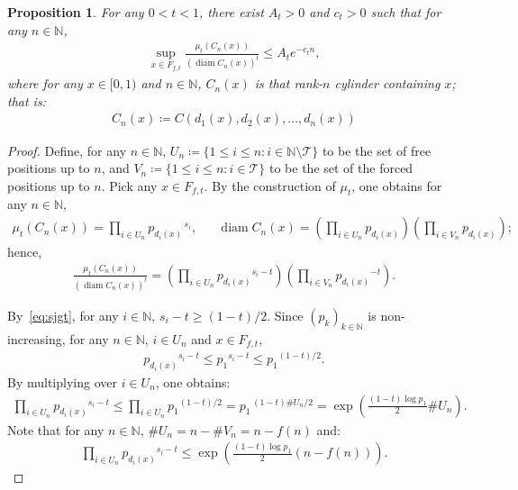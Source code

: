 \documentclass[12pt,reqno]{amsart}
\theoremstyle{definition}
\theoremstyle{plain}
\newtheorem{prop}{Proposition}
\begin{document}
\begin{prop}\label{prop: length-cylinder}
    For any $0<t<1$, there exist $A_t>0$ and $c_t>0$ such that for any $n\in\mathbb{N}$,
    \begin{align*}
        \sup_{x\in F_{f,t}}\frac{\mu_t(C_n(x))}{\left({\operatorname{diam}{C_n(x)}}\right)^t}
        \leq {A_t}{e^{-c_tn}},
    \end{align*}
    where for any $x\in[0,1)$ and $n\in\mathbb{N}$, $C_n(x)$ is that rank-$n$ cylinder containing $x$; that is:
    \begin{align*}
        C_n(x)\coloneqq C\left(d_1(x),d_2(x),\ldots,d_n(x)\right)
    \end{align*}
\end{prop}
\begin{proof}
    Define, for any $n\in\mathbb{N}$, $U_n\coloneqq \{1\leq i\leq n: i\in\mathbb{N}\setminus \mathcal{T} \}$ to be the set of free positions up to $n$, and $V_n\coloneqq \{1\leq i\leq n: i\in \mathcal{T} \}$ to be the set of the forced positions up to $n$. Pick any $x\in F_{f,t}$. 
    By the construction of $\mu_t$, one obtains for any $n\in\mathbb{N}$,
    \begin{align*}
        \mu_t(C_n(x))=\prod_{i\in U_n} {p_{d_i(x)}}^{\,s_{i}}, &&
        \operatorname{diam}{C_n(x)}
        =\left(\prod_{i\in U_n} p_{d_i(x)}\right) \left(\prod_{i\in V_n} p_{d_i(x)}\right);
    \end{align*}
    hence,
    \begin{align}\label{eq:ratio}
        \frac{\mu_t(C_n(x))}{\left(\operatorname{diam}{C_n(x)}\right)^t}
        =\left(\prod_{i\in U_n} {p_{d_i(x)}}^{s_i-t}\right)
        \left(\prod_{i\in V_n} {p_{d_i(x)}}^{-t}\right).
    \end{align}

    By~\eqref{eq:sjgt}, for any $i\in\mathbb{N}$, $s_i-t\geq (1-t)/2$. Since $(p_k)_{k\in\mathbb{N}}$ is non-increasing, for any $n\in\mathbb{N}$, $i\in U_n$ and $x\in F_{f,t}$,
    \begin{align*}
        {p_{d_i(x)}}^{s_i-t}\leq {p_1}^{s_i-t}\leq {p_1}^{(1-t)/2}.
    \end{align*}
    By multiplying over $i\in U_n$, one obtains:
    \begin{align*}
        \prod_{i\in U_n} {p_{d_i(x)}}^{s_i-t}
        \leq \prod_{i\in U_n} {p_1}^{(1-t)/2}
        = {p_1}^{\,(1-t)\#U_n/2}
        = \exp{\left(\frac{(1-t)\log p_1}{2}\#U_n\right)}.
    \end{align*}
    Note that for any $n\in\mathbb{N}$, $\#U_n=n-\#V_n=n-f(n)$ and: 
    \begin{align}\label{eq:free_factor_bound}
        \prod_{i\in U_n} {p_{d_i(x)}}^{s_i-t}
        \leq \exp{\left(\frac{(1-t)\log p_1}{2}(n-f(n))\right)}.
    \end{align}


\end{proof}
\end{document}
